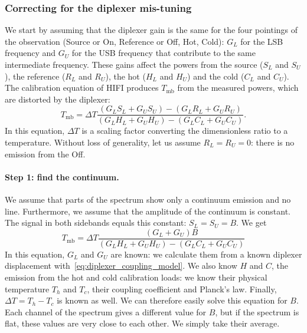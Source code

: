 \subsubsection{Correcting for the diplexer mis-tuning}
We start by assuming that the diplexer gain is the same for the four pointings of the observation (Source or On, Reference or Off, Hot, Cold):
$G_L$ for the LSB frequency and $G_U$ for the USB frequency that contribute to the same intermediate frequency.
These gains affect the powers from
the source ($S_L$ and $S_U$),
the reference ($R_L$ and $R_U$),
the hot ($H_L$ and $H_U$) and
the cold ($C_L$ and $C_U$).
The calibration equation of HIFI produces $T_\text{mb}$ from the measured powers, which are distorted by the diplexer:
\begin{equation}
    T_\text{mb}
    =
    \Delta T
    \frac{
        (G_L S_L + G_U S_U) - (G_L R_L + G_U R_U)
    }{
        (G_L H_L + G_U H_U) - (G_L C_L + G_U C_U)
    }\text{.}
\end{equation}
In this equation, $\Delta T$ is a scaling factor converting the dimensionless ratio to a temperature.
Without loss of generality, let us assume $R_L = R_U = 0$: there is no emission from the Off.

\paragraph{Step 1: find the continuum.}
We assume that parts of the spectrum show only a continuum emission and no line.
Furthermore, we assume that the amplitude of the continuum is constant.
The signal in both sidebands equals this constant: $S_L = S_U = B$.
We get
\begin{equation}
    T_\text{mb}
    =
    \Delta T
    \frac{
        (G_L + G_U) B
    }{
        (G_L H_L + G_U H_U) - (G_L C_L + G_U C_U)
    }
\end{equation}
In this equation, $G_L$ and $G_U$ are known: we calculate them from a known diplexer displacement with~\cref{eq:diplexer_coupling_model}.
We also know $H$ and $C$, the emission from the hot and cold calibration loads: we know their physical temperature $T_h$ and $T_c$, their coupling coefficient and Planck's law.
Finally, $\Delta T = T_h - T_c$ is known as well.
We can therefore easily solve this equation for $B$.
Each channel of the spectrum gives a different value for $B$, but if the spectrum is flat, these values are very close to each other.
We simply take their average.

